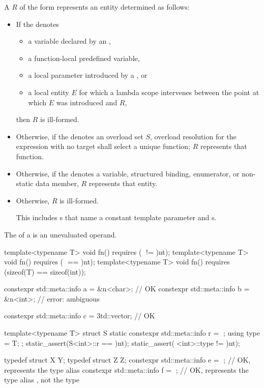 \pnum
A  $R$ of the form
represents an entity determined as follows:
\begin{itemize}
\item
If the  denotes
\begin{itemize}
\item
a variable declared by
an ,
\item
a function-local predefined variable,
\item
a local parameter introduced by
a , or
\item
a local entity $E$ for which a lambda scope intervenes
between the point at which $E$ was introduced and $R$,
\end{itemize}
then $R$ is ill-formed.
\item
Otherwise, if the  denotes an overload set $S$,
overload resolution for the expression  with no target
shall select a unique function;
$R$ represents that function.
\item
Otherwise, if the  denotes
a variable, structured binding, enumerator, or non-static data member,
$R$ represents that entity.
\item
Otherwise, $R$ is ill-formed.
\begin{note}
This includes s
that name a constant template parameter and
s.
\end{note}
\end{itemize}
The  of
a  is an unevaluated operand.
\begin{example}
\begin{codeblock}
template<typename T> void fn() requires (^^T != ^^int);
template<typename T> void fn() requires (^^T == ^^int);
template<typename T> void fn() requires (sizeof(T) == sizeof(int));

constexpr std::meta::info a = ^^fn<char>;       // OK
constexpr std::meta::info b = ^^fn<int>;        // error: ambiguous

constexpr std::meta::info c = ^^std::vector;    // OK

template<typename T>
struct S {
  static constexpr std::meta::info r = ^^T;
  using type = T;
};
static_assert(S<int>::r == ^^int);
static_assert(^^S<int>::type != ^^int);

typedef struct X {} Y;
typedef struct Z {} Z;
constexpr std::meta::info e = ^^Y;              // OK, represents the type alias 
constexpr std::meta::info f = ^^Z;              // OK, represents the type alias , not the type
\end{codeblock}
\end{example}

